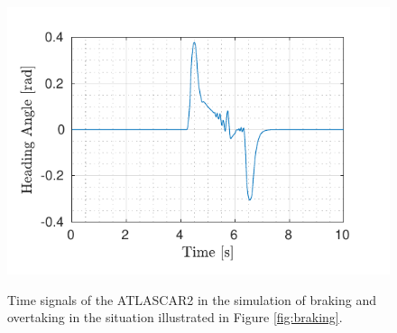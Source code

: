 \begin{figure}[!t]
\begin{minipage}[t]{0.5\textwidth}
		\subcaption{}\label{fig:delta_braking}
	\end{minipage}
	\begin{minipage}[t]{0.5\textwidth}
		\includegraphics[width=\textwidth]{./figure/three_obstacles_no_overtaking/HeadingAngleVsTime.pdf}
		\subcaption{}\label{fig:theta_braking}
	\end{minipage}
	\caption{Time signals of the ATLASCAR2 in the simulation of braking and overtaking in the situation illustrated in Figure \ref{fig:braking}.}
	\label{fig:components}
\end{figure}
